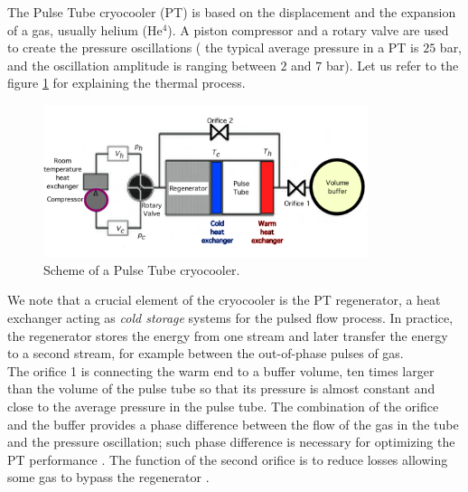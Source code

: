 \FloatBarrier
{} {The Pulse Tube cryocooler (PT) is based on the displacement and the expansion of a gas, usually helium (He$^4$).  A piston compressor and a rotary valve  are used to create the pressure oscillations ( the typical average pressure in a PT is ${25}$ bar, and the oscillation amplitude is ranging between $2$ and  $7$ bar). Let us refer to the figure \ref{fig:PT_scheme} for explaining the thermal process.
\begin{figure}[H]
	\begin{center}
		\includegraphics[width=9.5cm]{./Sec_SiteInfra/Figures/PT_scheme.pdf}
		\caption{Scheme of a Pulse Tube cryocooler.}
		\label{fig:PT_scheme}
	\end{center}
\end{figure}
We note that  a crucial element of the cryocooler is the  PT regenerator,  a heat exchanger acting as {\it cold storage} systems for the  pulsed flow process.   In practice, the regenerator  stores the energy from one stream and later transfer the energy to a second stream, for example between the out-of-phase pulses of gas. \\
The orifice 1  is connecting  the warm end  to a buffer volume, ten times larger than the volume of the pulse tube so that its pressure is almost constant and close to the average pressure in the pulse tube. The combination of the orifice and the buffer provides a phase difference between the flow of the gas in the tube and the pressure oscillation; such phase difference is necessary for optimizing the PT performance \cite{Mikulin}. The function of the second orifice  is to reduce losses allowing some gas to bypass the regenerator \cite{Zhu} .
}
